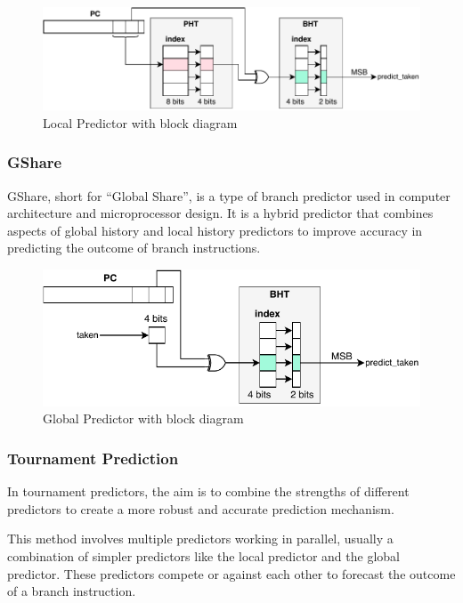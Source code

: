 \documentclass[12pt,a4paper,oneside]{book} %
\begin{document}
\begin{figure}[H]
    \centering
    \includegraphics[width=\textwidth]{images/predictor/local.pdf}
    \caption{Local Predictor with block diagram}
\end{figure}

\subsubsection{GShare}
GShare, short for ``Global Share'', is a type of branch predictor used in computer architecture and microprocessor design. It is a hybrid predictor that combines aspects of global history and local history predictors to improve accuracy in predicting the outcome of branch instructions.

\begin{figure}[H]
    \centering
    \includegraphics[width=.9\textwidth]{images/predictor/global.pdf}
    \caption{Global Predictor with block diagram}
\end{figure}

\subsubsection{Tournament Prediction}
In tournament predictors, the aim is to combine the strengths of different predictors to create a more robust and accurate prediction mechanism.

This method involves multiple predictors working in parallel, usually a combination of simpler predictors like the local predictor and the global predictor. These predictors compete or against each other to forecast the outcome of a branch instruction.
\end{document}
